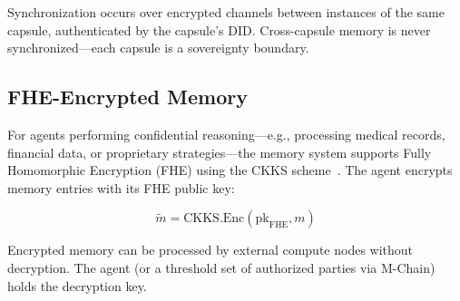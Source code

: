 Synchronization occurs over encrypted channels between instances of the same capsule, authenticated by the capsule's DID. Cross-capsule memory is never synchronized---each capsule is a sovereignty boundary.

\subsection{FHE-Encrypted Memory}

For agents performing confidential reasoning---e.g., processing medical records, financial data, or proprietary strategies---the memory system supports Fully Homomorphic Encryption (FHE) using the CKKS scheme~\cite{cheon2017ckks}. The agent encrypts memory entries with its FHE public key:

\begin{equation}\label{eq:fhe-memory}
    \tilde{m} = \text{CKKS.Enc}(\text{pk}_{\text{FHE}}, m)
\end{equation}

Encrypted memory can be processed by external compute nodes without decryption. The agent (or a threshold set of authorized parties via M-Chain) holds the decryption key.

